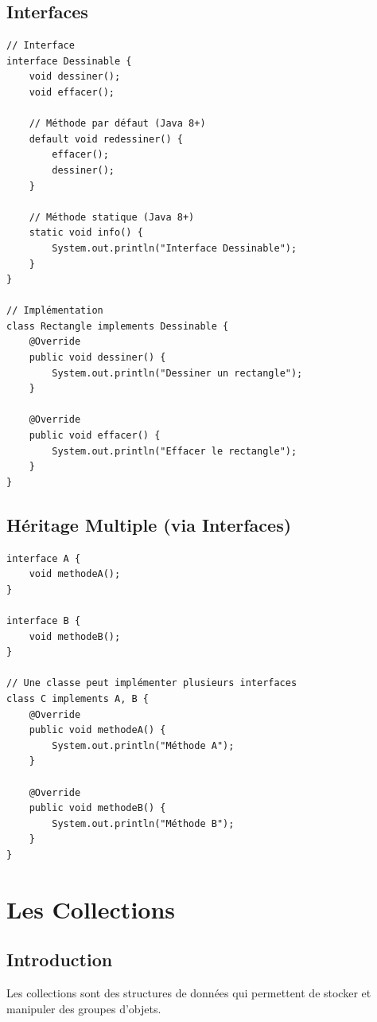 \documentclass[11pt,a4paper]{article}
\begin{document}
\subsection{Interfaces}

\begin{lstlisting}
// Interface
interface Dessinable {
    void dessiner();
    void effacer();
    
    // Méthode par défaut (Java 8+)
    default void redessiner() {
        effacer();
        dessiner();
    }
    
    // Méthode statique (Java 8+)
    static void info() {
        System.out.println("Interface Dessinable");
    }
}

// Implémentation
class Rectangle implements Dessinable {
    @Override
    public void dessiner() {
        System.out.println("Dessiner un rectangle");
    }
    
    @Override
    public void effacer() {
        System.out.println("Effacer le rectangle");
    }
}
\end{lstlisting}

\subsection{Héritage Multiple (via Interfaces)}

\begin{lstlisting}
interface A {
    void methodeA();
}

interface B {
    void methodeB();
}

// Une classe peut implémenter plusieurs interfaces
class C implements A, B {
    @Override
    public void methodeA() {
        System.out.println("Méthode A");
    }
    
    @Override
    public void methodeB() {
        System.out.println("Méthode B");
    }
}
\end{lstlisting}

\newpage

\section{Les Collections}

\subsection{Introduction}

Les collections sont des structures de données qui permettent de stocker et manipuler des groupes d'objets.
\end{document}
